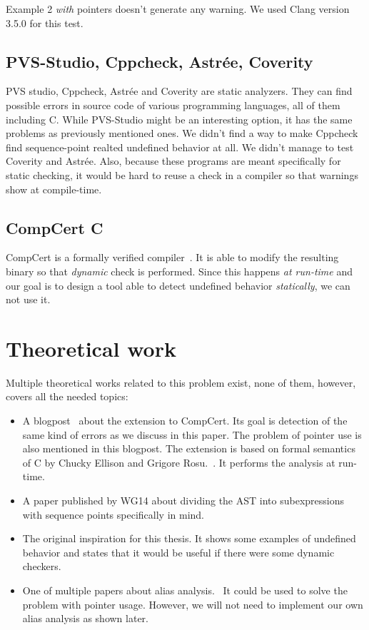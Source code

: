 Example 2 \emph{with} pointers doesn't generate any warning. We used Clang version 3.5.0 for this test.

\subsection{PVS-Studio, Cppcheck, Astrée, Coverity}
PVS studio, Cppcheck, Astrée and Coverity are static analyzers. They can find possible errors in source code of various programming languages, all of them including C. While PVS-Studio might be an interesting option, it has the same problems as previously mentioned ones. We didn't find a way to make Cppcheck find sequence-point realted undefined behavior at all. We didn't manage to test Coverity and Astrée. Also, because these programs are meant specifically for static checking, it would be hard to reuse a check in a compiler so that warnings show at compile-time.
\subsection{CompCert C}
CompCert is a formally verified compiler~\cite{CompCert}. It is able to modify the resulting binary so that \emph{dynamic} check is performed. Since this happens \emph{at run-time} and our goal is to design a tool able to detect undefined behavior \emph{statically}, we can not use it.
\section{Theoretical work}
Multiple theoretical works related to this problem exist, none of them, however, covers all the needed topics:
\begin{itemize}
\item A blogpost~\cite{CompCertBlogpost} about the extension to CompCert. Its goal is detection of the same kind of errors as we discuss in this paper. The problem of pointer use is also mentioned in this blogpost. The extension is based on formal semantics of C by Chucky Ellison and Grigore Rosu.~\cite{formalSemantics}. It performs the analysis at run-time.
\item A paper published by WG14 about dividing the AST into subexpressions with sequence points specifically in mind.~\cite{seqPointWG14}
\item The original inspiration for this thesis. It shows some examples of undefined behavior and states that it would be useful if there were some dynamic checkers.~\cite{regehr}
\item One of multiple papers about alias analysis.~\cite{steensgaard} It could be used to solve the problem with pointer usage. However, we will not need to implement our own alias analysis as shown later.
\end{itemize}
